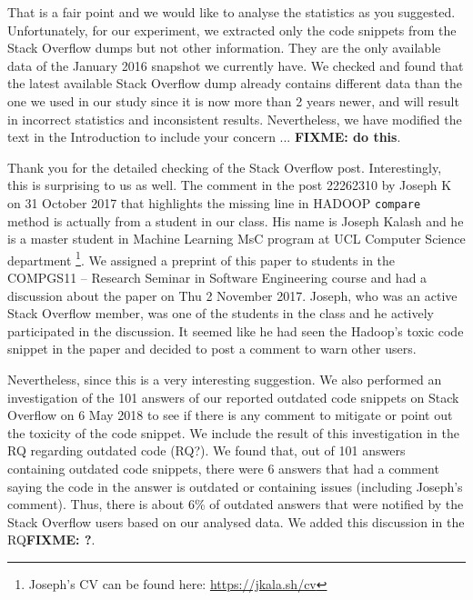 \documentclass[a4paper,twoside,10pt]{reviewresponse}
\newcommand\FIXME[1]{{\color{red}\textbf{FIXME: #1}}}
\begin{document}
That is a fair point and we would like to analyse the statistics as you suggested. Unfortunately, for our experiment, we extracted only the code snippets from the Stack Overflow dumps but not other information. They are the only available data of the January 2016 snapshot we currently have. We checked and found that the latest available Stack Overflow dump already contains different data than the one we used in our study since it is now more than 2 years newer, and will result in incorrect statistics and inconsistent results. Nevertheless, we have modified the text in the Introduction to include your concern ... \FIXME{do this}.


Thank you for the detailed checking of the Stack Overflow post. Interestingly, this is surprising to us as well. The comment in the post 22262310 by Joseph K on 31 October 2017 that highlights the missing line in HADOOP \texttt{compare} method is actually from a student in our class. His name is Joseph Kalash and he is a master student in Machine Learning MsC program at UCL Computer Science department \footnote{Joseph's CV can be found here: \url{https://jkala.sh/cv}}. We assigned a preprint of this paper to students in the COMPGS11 -- Research Seminar in Software Engineering course and had a discussion about the paper on Thu 2 November 2017. Joseph, who was an active Stack Overflow member, was one of the students in the class and he actively participated in the discussion. It seemed like he had seen the Hadoop's toxic code snippet in the paper and decided to post a comment to warn other users.

Nevertheless, since this is a very interesting suggestion. We also performed an investigation of the 101 answers of our reported outdated code snippets on Stack Overflow on 6 May 2018 to see if there is any comment to mitigate or point out the toxicity of the code snippet. We include the result of this investigation in the RQ regarding outdated code (RQ?). We found that, out of 101 answers containing outdated code snippets, there were 6 answers that had a comment saying the code in the answer is outdated or containing issues (including Joseph's comment). Thus, there is about 6\% of outdated answers that were notified by the Stack Overflow users based on our analysed data. We added this discussion in the RQ\FIXME{?}.
\end{document}
